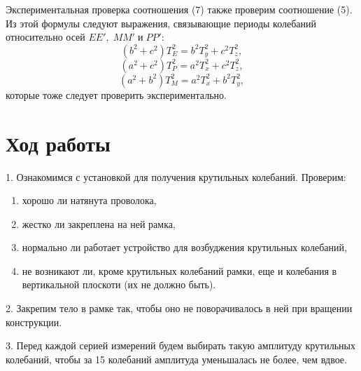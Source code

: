 \documentclass[a4paper, 12pt]{article}
\begin{document}

        Экспериментальная проверка соотношения (7) также проверим соотношение (5). Из этой формулы следуют выражения, связывающие периоды колебаний относительно осей $EE',\;MM'\;и\;PP'$:
        \begin{equation}
            (b^2 + c^2)T_E^2 = b^2T_y^2 + c^2T_z^2,
        \end{equation}
        \begin{equation}
            (a^2 + c^2)T_P^2 = a^2T_x^2 + c^2T_z^2,
        \end{equation}
        \begin{equation}
            (a^2 + b^2)T_M^2 = a^2T_x^2 + b^2T_y^2,
        \end{equation}
        которые тоже следует проверить экспериментально.

    \newpage
        
    \section*{Ход работы}
        1. Ознакомимся с установкой для получения крутильных колебаний. Проверим:
        \begin{enumerate}[label=\arabic*)]
            \item хорошо ли натянута проволока,
            \item жестко ли закреплена на ней рамка, 
            \item нормально ли работает устройство для возбуджения крутильных колебаний,
            \item не возникают ли, кроме крутильных колебаний рамки, еще и колебания в вертикальной плоскоти (их не должно быть).
        \end{enumerate}   

        2. Закрепим тело в рамке так, чтобы оно не поворачивалось в ней при вращении конструкции.

        3. Перед каждой серией измерений будем выбирать такую амплитуду крутильных колебаний, чтобы за 15 колебаний амплитуда уменьшалась не более, чем вдвое.
        
\end{document}
